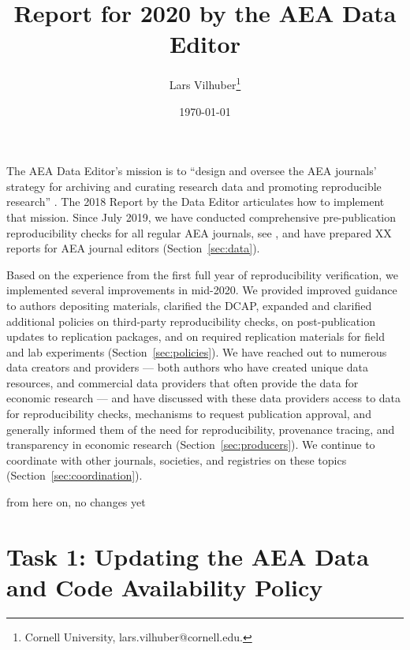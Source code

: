 \documentclass[PP]{AEA}
\begin{document}
\title{Report for 2020 by the AEA Data Editor }
\author{Lars Vilhuber\thanks{%
Cornell University, lars.vilhuber@cornell.edu. }
}
\date{\today}
\pubVolume{--}
\pubIssue{--}
\JEL{}




\maketitle

The \ac{AEA} Data Editor's  mission is to ``design  and  oversee  the  AEA  journals’  strategy for archiving and curating research data and promoting  reproducible  research'' \citep{10.1257/pandp.108.745}. The 2018 Report by the Data Editor \citep{10.1257/pandp.109.718} articulates how to implement that mission. Since July 2019, we have conducted comprehensive pre-publication reproducibility checks for all regular AEA journals, see , and have prepared XX reports for AEA journal editors (Section~\ref{sec:data}).

Based on the experience from the first full year of reproducibility verification, we implemented several improvements in mid-2020. We provided improved guidance to authors depositing materials, clarified the \ac{DCAP}, expanded and clarified additional policies on third-party reproducibility checks, on post-publication updates to replication packages, and on required replication materials for field and lab experiments  (Section~\ref{sec:policies}). We have reached out to numerous data creators and providers --- both authors who have created unique data resources, and commercial data providers that often provide the data for economic research --- and have discussed with these data providers access to data for reproducibility checks, mechanisms to request publication approval, and generally informed them of the need for reproducibility, provenance tracing, and transparency in economic research (Section~\ref{sec:producers}). 
We continue to coordinate with other journals, societies, and registries on these topics (Section~\ref{sec:coordination}).

\begin{center}
	from here on, no changes yet
\end{center}

\section{Task 1: Updating the AEA Data and Code Availability Policy}
\label{sec:dcap}
\end{document}
